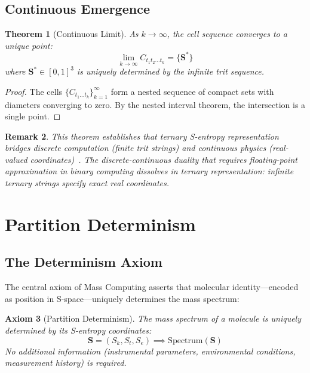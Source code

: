 \documentclass[twocolumn,10pt]{article}
\newtheorem{theorem}{Theorem}[section]
\newtheorem{axiom}[theorem]{Axiom}
\newtheorem{remark}[theorem]{Remark}
\begin{document}
\subsection{Continuous Emergence}

\begin{theorem}[Continuous Limit]
\label{thm:continuous}
As $k \to \infty$, the cell sequence converges to a unique point:
\begin{equation}
\lim_{k \to \infty} C_{t_1 t_2 \ldots t_k} = \{\mathbf{S}^*\}
\end{equation}
where $\mathbf{S}^* \in [0,1]^3$ is uniquely determined by the infinite trit sequence.
\end{theorem}

\begin{proof}
The cells $\{C_{t_1 \ldots t_k}\}_{k=1}^\infty$ form a nested sequence of compact sets with diameters converging to zero. By the nested interval theorem, the intersection is a single point.
\end{proof}

\begin{remark}
This theorem establishes that ternary S-entropy representation bridges discrete computation (finite trit strings) and continuous physics (real-valued coordinates)~\cite{landauer1961irreversibility}. The discrete-continuous duality that requires floating-point approximation in binary computing dissolves in ternary representation: infinite ternary strings specify exact real coordinates.
\end{remark}

\section{Partition Determinism}
\label{sec:determinism}

\subsection{The Determinism Axiom}

The central axiom of Mass Computing asserts that molecular identity---encoded as position in S-space---uniquely determines the mass spectrum:

\begin{axiom}[Partition Determinism]
\label{ax:determinism}
The mass spectrum of a molecule is uniquely determined by its S-entropy coordinates:
\begin{equation}
\mathbf{S} = (S_k, S_t, S_e) \implies \text{Spectrum}(\mathbf{S})
\end{equation}
No additional information (instrumental parameters, environmental conditions, measurement history) is required.
\end{axiom}
\end{document}
